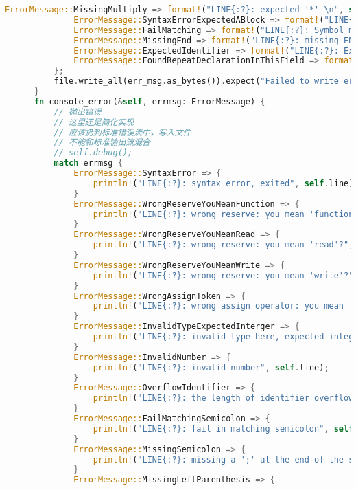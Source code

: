 \begin{lstlisting}[caption={语法分析器parse.rs}, label={4:code-example}, captionpos=t, language=rust]
              ErrorMessage::MissingMultiply => format!("LINE{:?}: expected '*' \n", self.line),
              ErrorMessage::SyntaxErrorExpectedABlock => format!("LINE{:?}: syntax error, expected a block\n", self.line),
              ErrorMessage::FailMatching => format!("LINE{:?}: Symbol matching error!\n", self.line),
              ErrorMessage::MissingEnd => format!("LINE{:?}: missing END: this block is not covered\n", self.line),
              ErrorMessage::ExpectedIdentifier => format!("LINE{:?}: Expected identifier in this field\n", self.line),
              ErrorMessage::FoundRepeatDeclarationInThisField => format!("LINE{:?}: this symbol's declaration repeated in this field\n", self.line),
          };
          file.write_all(err_msg.as_bytes()).expect("Failed to write error file");
      }
      fn console_error(&self, errmsg: ErrorMessage) {
          // 抛出错误
          // 这里还是简化实现
          // 应该扔到标准错误流中，写入文件
          // 不能和标准输出流混合
          // self.debug();
          match errmsg {
              ErrorMessage::SyntaxError => {
                  println!("LINE{:?}: syntax error, exited", self.line);
              }
              ErrorMessage::WrongReserveYouMeanFunction => {
                  println!("LINE{:?}: wrong reserve: you mean 'function'?", self.line);
              }
              ErrorMessage::WrongReserveYouMeanRead => {
                  println!("LINE{:?}: wrong reserve: you mean 'read'?", self.line);
              }
              ErrorMessage::WrongReserveYouMeanWrite => {
                  println!("LINE{:?}: wrong reserve: you mean 'write'?", self.line);
              }
              ErrorMessage::WrongAssignToken => {
                  println!("LINE{:?}: wrong assign operator: you mean ':='?", self.line);
              }
              ErrorMessage::InvalidTypeExpectedInterger => {
                  println!("LINE{:?}: invalid type here, expected integer", self.line);
              }
              ErrorMessage::InvalidNumber => {
                  println!("LINE{:?}: invalid number", self.line);
              }
              ErrorMessage::OverflowIdentifier => {
                  println!("LINE{:?}: the length of identifier overflows", self.line);
              }
              ErrorMessage::FailMatchingSemicolon => {
                  println!("LINE{:?}: fail in matching semicolon", self.line);
              }
              ErrorMessage::MissingSemicolon => {
                  println!("LINE{:?}: missing a ';' at the end of the statement", self.line);
              }
              ErrorMessage::MissingLeftParenthesis => {

\end{lstlisting}
